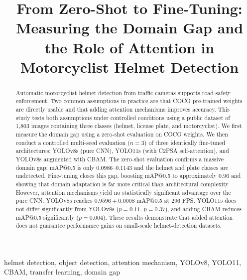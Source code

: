 \documentclass[conference]{IEEEtran}
\begin{document}
\title{From Zero-Shot to Fine-Tuning: Measuring the Domain Gap and the Role of Attention in Motorcyclist Helmet Detection}

\author{
}

\maketitle

\begin{abstract}
Automatic motorcyclist helmet detection from traffic cameras supports road-safety enforcement. Two common assumptions in practice are that COCO pre-trained weights are directly usable and that adding attention mechanisms improves accuracy. This study tests both assumptions under controlled conditions using a public dataset of 1,803 images containing three classes (helmet, license plate, and motorcyclist). We first measure the domain gap using a zero-shot evaluation on COCO weights. We then conduct a controlled multi-seed evaluation ($n=3$) of three identically fine-tuned architectures: YOLOv8s (pure CNN), YOLO11s (with C2PSA self-attention), and YOLOv8s augmented with CBAM. The zero-shot evaluation confirms a massive domain gap: mAP@0.5 is only $0.0986$--$0.1143$ and the helmet and plate classes are undetected. Fine-tuning closes this gap, boosting mAP@0.5 to approximately $0.96$ and showing that domain adaptation is far more critical than architectural complexity. However, attention mechanisms yield no statistically significant advantage over the pure CNN. YOLOv8s reaches $0.9596 \pm 0.0008$ mAP@0.5 at $296$ FPS. YOLO11s does not differ significantly from YOLOv8s ($p=0.11$, $p=0.37$), and adding CBAM reduces mAP@0.5 significantly ($p=0.004$). These results demonstrate that added attention does not guarantee performance gains on small-scale helmet-detection datasets.
\end{abstract}

\begin{IEEEkeywords}
helmet detection, object detection, attention mechanism, YOLOv8, YOLO11, CBAM, transfer learning, domain gap
\end{IEEEkeywords}
\end{document}
